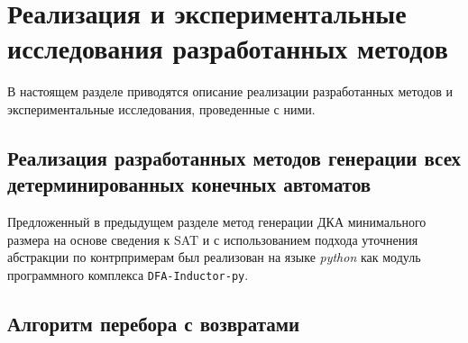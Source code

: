 
\section{Реализация и экспериментальные исследования разработанных методов}
\label{sec:findall:results}

В настоящем разделе приводятся описание реализации разработанных методов и экспериментальные исследования, проведенные с ними.


\subsection{Реализация разработанных методов генерации всех детерминированных конечных автоматов}
\label{sec:findall:results:impl}

Предложенный в предыдущем разделе метод генерации ДКА минимального размера на основе сведения к SAT и с использованием подхода уточнения абстракции по контрпримерам был реализован на языке \emph{python} как модуль программного комплекса \texttt{DFA-Inductor-py}.


\subsection{Алгоритм перебора с возвратами}
\label{sec:findall:results:backtracking}

